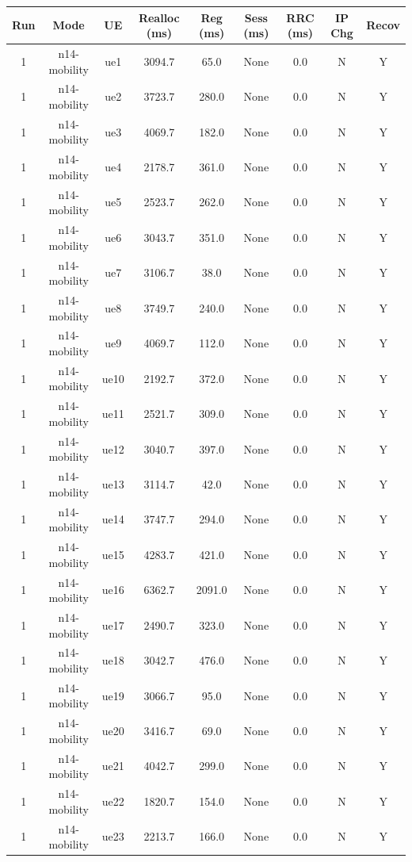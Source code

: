 \begin{table}[ht]
\centering
\begin{tabular}{|c|c|c|c|c|c|c|c|c|}
\hline
Run & Mode & UE & Realloc (ms) & Reg (ms) & Sess (ms) & RRC (ms) & IP Chg & Recov \\
\hline
1 & n14-mobility & ue1 & 3094.7 & 65.0 & None & 0.0 & N & Y \\
1 & n14-mobility & ue2 & 3723.7 & 280.0 & None & 0.0 & N & Y \\
1 & n14-mobility & ue3 & 4069.7 & 182.0 & None & 0.0 & N & Y \\
1 & n14-mobility & ue4 & 2178.7 & 361.0 & None & 0.0 & N & Y \\
1 & n14-mobility & ue5 & 2523.7 & 262.0 & None & 0.0 & N & Y \\
1 & n14-mobility & ue6 & 3043.7 & 351.0 & None & 0.0 & N & Y \\
1 & n14-mobility & ue7 & 3106.7 & 38.0 & None & 0.0 & N & Y \\
1 & n14-mobility & ue8 & 3749.7 & 240.0 & None & 0.0 & N & Y \\
1 & n14-mobility & ue9 & 4069.7 & 112.0 & None & 0.0 & N & Y \\
1 & n14-mobility & ue10 & 2192.7 & 372.0 & None & 0.0 & N & Y \\
1 & n14-mobility & ue11 & 2521.7 & 309.0 & None & 0.0 & N & Y \\
1 & n14-mobility & ue12 & 3040.7 & 397.0 & None & 0.0 & N & Y \\
1 & n14-mobility & ue13 & 3114.7 & 42.0 & None & 0.0 & N & Y \\
1 & n14-mobility & ue14 & 3747.7 & 294.0 & None & 0.0 & N & Y \\
1 & n14-mobility & ue15 & 4283.7 & 421.0 & None & 0.0 & N & Y \\
1 & n14-mobility & ue16 & 6362.7 & 2091.0 & None & 0.0 & N & Y \\
1 & n14-mobility & ue17 & 2490.7 & 323.0 & None & 0.0 & N & Y \\
1 & n14-mobility & ue18 & 3042.7 & 476.0 & None & 0.0 & N & Y \\
1 & n14-mobility & ue19 & 3066.7 & 95.0 & None & 0.0 & N & Y \\
1 & n14-mobility & ue20 & 3416.7 & 69.0 & None & 0.0 & N & Y \\
1 & n14-mobility & ue21 & 4042.7 & 299.0 & None & 0.0 & N & Y \\
1 & n14-mobility & ue22 & 1820.7 & 154.0 & None & 0.0 & N & Y \\
1 & n14-mobility & ue23 & 2213.7 & 166.0 & None & 0.0 & N & Y \\

\end{tabular}
\end{table}
